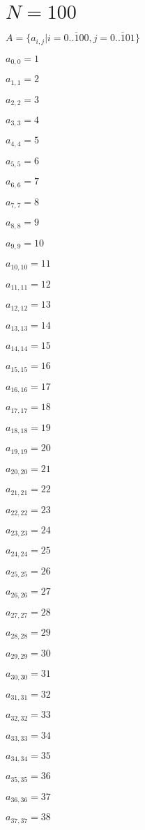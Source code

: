 \documentclass[a4paper,12pt]{article}
\begin{document}
\section{ $N = 100$ }
$A = \{ a _{ i, j } | i = \overline { 0..100 }, j = \overline { 0..101 } \}$

$a _{ 0, 0 } = 1$

$a _{ 1, 1 } = 2$

$a _{ 2, 2 } = 3$

$a _{ 3, 3 } = 4$

$a _{ 4, 4 } = 5$

$a _{ 5, 5 } = 6$

$a _{ 6, 6 } = 7$

$a _{ 7, 7 } = 8$

$a _{ 8, 8 } = 9$

$a _{ 9, 9 } = 10$

$a _{ 10, 10 } = 11$

$a _{ 11, 11 } = 12$

$a _{ 12, 12 } = 13$

$a _{ 13, 13 } = 14$

$a _{ 14, 14 } = 15$

$a _{ 15, 15 } = 16$

$a _{ 16, 16 } = 17$

$a _{ 17, 17 } = 18$

$a _{ 18, 18 } = 19$

$a _{ 19, 19 } = 20$

$a _{ 20, 20 } = 21$

$a _{ 21, 21 } = 22$

$a _{ 22, 22 } = 23$

$a _{ 23, 23 } = 24$

$a _{ 24, 24 } = 25$

$a _{ 25, 25 } = 26$

$a _{ 26, 26 } = 27$

$a _{ 27, 27 } = 28$

$a _{ 28, 28 } = 29$

$a _{ 29, 29 } = 30$

$a _{ 30, 30 } = 31$

$a _{ 31, 31 } = 32$

$a _{ 32, 32 } = 33$

$a _{ 33, 33 } = 34$

$a _{ 34, 34 } = 35$

$a _{ 35, 35 } = 36$

$a _{ 36, 36 } = 37$

$a _{ 37, 37 } = 38$
\end{document}
